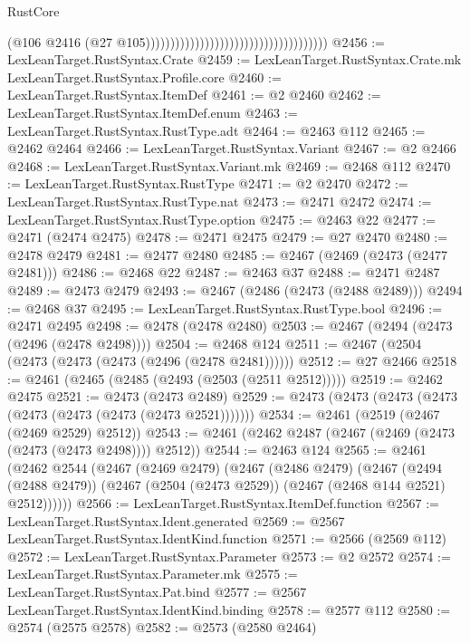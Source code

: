 \begin{lexlean}{RustCore}
\begin{coremodule}
                                                                          (@106
                                                                            @2416
                                                                            (@27
                                                                              @105)))))))))))))))))))))))))))))))))))))
@2456 := LexLeanTarget.RustSyntax.Crate
@2459 := LexLeanTarget.RustSyntax.Crate.mk LexLeanTarget.RustSyntax.Profile.core
@2460 := LexLeanTarget.RustSyntax.ItemDef
@2461 := @2 @2460
@2462 := LexLeanTarget.RustSyntax.ItemDef.enum
@2463 := LexLeanTarget.RustSyntax.RustType.adt
@2464 := @2463 @112
@2465 := @2462 @2464
@2466 := LexLeanTarget.RustSyntax.Variant
@2467 := @2 @2466
@2468 := LexLeanTarget.RustSyntax.Variant.mk
@2469 := @2468 @112
@2470 := LexLeanTarget.RustSyntax.RustType
@2471 := @2 @2470
@2472 := LexLeanTarget.RustSyntax.RustType.nat
@2473 := @2471 @2472
@2474 := LexLeanTarget.RustSyntax.RustType.option
@2475 := @2463 @22
@2477 := @2471 (@2474 @2475)
@2478 := @2471 @2475
@2479 := @27 @2470
@2480 := @2478 @2479
@2481 := @2477 @2480
@2485 := @2467 (@2469 (@2473 (@2477 @2481)))
@2486 := @2468 @22
@2487 := @2463 @37
@2488 := @2471 @2487
@2489 := @2473 @2479
@2493 := @2467 (@2486 (@2473 (@2488 @2489)))
@2494 := @2468 @37
@2495 := LexLeanTarget.RustSyntax.RustType.bool
@2496 := @2471 @2495
@2498 := @2478 (@2478 @2480)
@2503 := @2467 (@2494 (@2473 (@2496 (@2478 @2498))))
@2504 := @2468 @124
@2511 := @2467 (@2504 (@2473 (@2473 (@2473 (@2496 (@2478 @2481))))))
@2512 := @27 @2466
@2518 := @2461 (@2465 (@2485 (@2493 (@2503 (@2511 @2512)))))
@2519 := @2462 @2475
@2521 := @2473 (@2473 @2489)
@2529 := @2473 (@2473 (@2473 (@2473 (@2473 (@2473 (@2473 (@2473 @2521)))))))
@2534 := @2461 (@2519 (@2467 (@2469 @2529) @2512))
@2543 := @2461 (@2462 @2487 (@2467 (@2469 (@2473 (@2473 (@2473 @2498)))) @2512))
@2544 := @2463 @124
@2565 := @2461
    (@2462
      @2544
      (@2467
        (@2469 @2479)
        (@2467
          (@2486 @2479)
          (@2467
            (@2494 (@2488 @2479))
            (@2467 (@2504 (@2473 @2529)) (@2467 (@2468 @144 @2521) @2512))))))
@2566 := LexLeanTarget.RustSyntax.ItemDef.function
@2567 := LexLeanTarget.RustSyntax.Ident.generated
@2569 := @2567 LexLeanTarget.RustSyntax.IdentKind.function
@2571 := @2566 (@2569 @112)
@2572 := LexLeanTarget.RustSyntax.Parameter
@2573 := @2 @2572
@2574 := LexLeanTarget.RustSyntax.Parameter.mk
@2575 := LexLeanTarget.RustSyntax.Pat.bind
@2577 := @2567 LexLeanTarget.RustSyntax.IdentKind.binding
@2578 := @2577 @112
@2580 := @2574 (@2575 @2578)
@2582 := @2573 (@2580 @2464)

\end{coremodule}
\end{lexlean}

